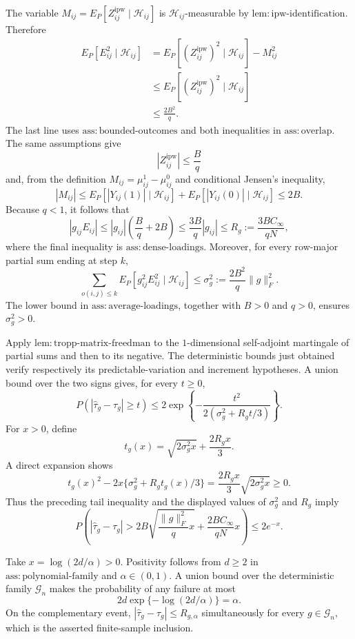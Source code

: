 The variable \(M_{ij}=E_P[Z^{\mathrm{ipw}}_{ij}\mid\mathcal H_{ij}]\) is \(\mathcal H_{ij}\)-measurable by \(\mathrm{lem:ipw\mbox{-}identification}\).  Therefore
\[
\begin{aligned}
 E_P[E_{ij}^2\mid\mathcal H_{ij}]
 &=E_P[(Z^{\mathrm{ipw}}_{ij})^2\mid\mathcal H_{ij}]-M_{ij}^2\\
 &\le E_P[(Z^{\mathrm{ipw}}_{ij})^2\mid\mathcal H_{ij}]\\
 &\le \frac{2B^2}{q}.
\end{aligned}
\]
The last line uses \(\mathrm{ass:bounded\mbox{-}outcomes}\) and both inequalities in \(\mathrm{ass:overlap}\).  The same assumptions give
\[
 |Z^{\mathrm{ipw}}_{ij}|\le \frac{B}{q}
\]
and, from the definition \(M_{ij}=\mu^1_{ij}-\mu^0_{ij}\) and conditional Jensen's inequality,
\[
 |M_{ij}|
 \le E_P[|Y_{ij}(1)|\mid\mathcal H_{ij}]
     +E_P[|Y_{ij}(0)|\mid\mathcal H_{ij}]
 \le 2B.
\]
Because \(q<1\), it follows that
\[
 |g_{ij}E_{ij}|
 \le |g_{ij}|\left(\frac{B}{q}+2B\right)
 \le \frac{3B}{q}|g_{ij}|
 \le R_g:=\frac{3BC_\infty}{qN},
\]
where the final inequality is \(\mathrm{ass:dense\mbox{-}loadings}\).  Moreover, for every row-major partial sum ending at step \(k\),
\[
 \sum_{o(i,j)\le k}E_P[g_{ij}^2E_{ij}^2\mid\mathcal H_{ij}]
 \le \sigma_g^2:=\frac{2B^2}{q}\lVert g\rVert_F^2.
\]
The lower bound in \(\mathrm{ass:average\mbox{-}loadings}\), together with \(B>0\) and \(q>0\), ensures \(\sigma_g^2>0\).

Apply \(\mathrm{lem:tropp\mbox{-}matrix\mbox{-}freedman}\) to the \(1\)-dimensional self-adjoint martingale of partial sums and then to its negative.  The deterministic bounds just obtained verify respectively its predictable-variation and increment hypotheses.  A union bound over the two signs gives, for every \(t\ge0\),
\[
 P\!\left(\left|\widehat\tau_g-\tau_g\right|\ge t\right)
 \le 2\exp\!\left\{-\frac{t^2}{2(\sigma_g^2+R_gt/3)}\right\}.
\]
For \(x>0\), define
\[
 t_g(x)=\sqrt{2\sigma_g^2x}+\frac{2R_gx}{3}.
\]
A direct expansion shows
\[
 t_g(x)^2-2x\{\sigma_g^2+R_gt_g(x)/3\}
 =\frac{2R_gx}{3}\sqrt{2\sigma_g^2x}\ge0.
\]
Thus the preceding tail inequality and the displayed values of \(\sigma_g^2\) and \(R_g\) imply
\[
 P\!\left(
 |\widehat\tau_g-\tau_g|>
 2B\sqrt{\frac{\lVert g\rVert_F^2}{q}x}
 +\frac{2BC_\infty}{qN}x
 \right)\le2e^{-x}.
\]

Take \(x=\log(2d/\alpha)>0\).  Positivity follows from \(d\ge2\) in \(\mathrm{ass:polynomial\mbox{-}family}\) and \(\alpha\in(0,1)\).  A union bound over the deterministic family \(\mathcal G_n\) makes the probability of any failure at most
\[
 2d\exp\{-\log(2d/\alpha)\}=\alpha.
\]
On the complementary event, \(|\widehat\tau_g-\tau_g|\le R_{g,\alpha}\) simultaneously for every \(g\in\mathcal G_n\), which is the asserted finite-sample inclusion.

